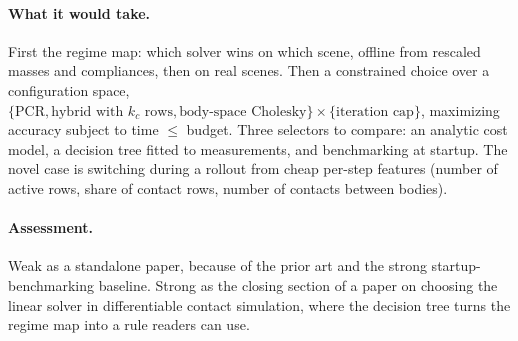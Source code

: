 \paragraph{What it would take.}
First the regime map: which solver wins on which scene, offline from
rescaled masses and compliances, then on real scenes. Then a constrained
choice over a configuration space, $\{\text{PCR}, \text{hybrid with } k_c
\text{ rows}, \text{body-space Cholesky}\} \times \{\text{iteration cap}\}$,
maximizing accuracy subject to time $\le$ budget. Three selectors to
compare: an analytic cost model, a decision tree fitted to measurements,
and benchmarking at startup. The novel case is switching during a rollout
from cheap per-step features (number of active rows, share of contact
rows, number of contacts between bodies).

\paragraph{Assessment.}
Weak as a standalone paper, because of the prior art and the strong
startup-benchmarking baseline. Strong as the closing section of a paper
on choosing the linear solver in differentiable contact simulation, where
the decision tree turns the regime map into a rule readers can use.
